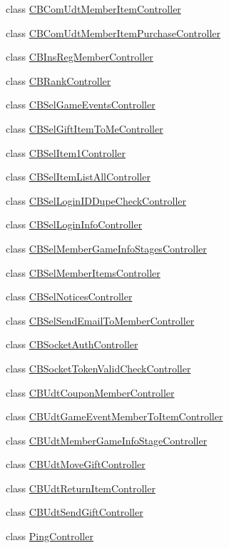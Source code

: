 \begin{DoxyCompactItemize}
class \hyperlink{a00025}{C\+B\+Com\+Udt\+Member\+Item\+Controller}
\item 
class \hyperlink{a00026}{C\+B\+Com\+Udt\+Member\+Item\+Purchase\+Controller}
\item 
class \hyperlink{a00027}{C\+B\+Ins\+Reg\+Member\+Controller}
\item 
class \hyperlink{a00029}{C\+B\+Rank\+Controller}
\item 
class \hyperlink{a00031}{C\+B\+Sel\+Game\+Events\+Controller}
\item 
class \hyperlink{a00032}{C\+B\+Sel\+Gift\+Item\+To\+Me\+Controller}
\item 
class \hyperlink{a00033}{C\+B\+Sel\+Item1\+Controller}
\item 
class \hyperlink{a00034}{C\+B\+Sel\+Item\+List\+All\+Controller}
\item 
class \hyperlink{a00035}{C\+B\+Sel\+Login\+I\+D\+Dupe\+Check\+Controller}
\item 
class \hyperlink{a00036}{C\+B\+Sel\+Login\+Info\+Controller}
\item 
class \hyperlink{a00037}{C\+B\+Sel\+Member\+Game\+Info\+Stages\+Controller}
\item 
class \hyperlink{a00038}{C\+B\+Sel\+Member\+Items\+Controller}
\item 
class \hyperlink{a00039}{C\+B\+Sel\+Notices\+Controller}
\item 
class \hyperlink{a00040}{C\+B\+Sel\+Send\+Email\+To\+Member\+Controller}
\item 
class \hyperlink{a00041}{C\+B\+Socket\+Auth\+Controller}
\item 
class \hyperlink{a00042}{C\+B\+Socket\+Token\+Valid\+Check\+Controller}
\item 
class \hyperlink{a00043}{C\+B\+Udt\+Coupon\+Member\+Controller}
\item 
class \hyperlink{a00044}{C\+B\+Udt\+Game\+Event\+Member\+To\+Item\+Controller}
\item 
class \hyperlink{a00045}{C\+B\+Udt\+Member\+Game\+Info\+Stage\+Controller}
\item 
class \hyperlink{a00046}{C\+B\+Udt\+Move\+Gift\+Controller}
\item 
class \hyperlink{a00047}{C\+B\+Udt\+Return\+Item\+Controller}
\item 
class \hyperlink{a00048}{C\+B\+Udt\+Send\+Gift\+Controller}
\item 
class \hyperlink{a00083}{Ping\+Controller}
\end{DoxyCompactItemize}
